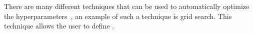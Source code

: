 There are many different techniques that can be used to automatically optimize the hyperparameters~\cite{automated-machine-learning}, an example of such a technique is grid search. This technique allows the user to define .
 
 
 





